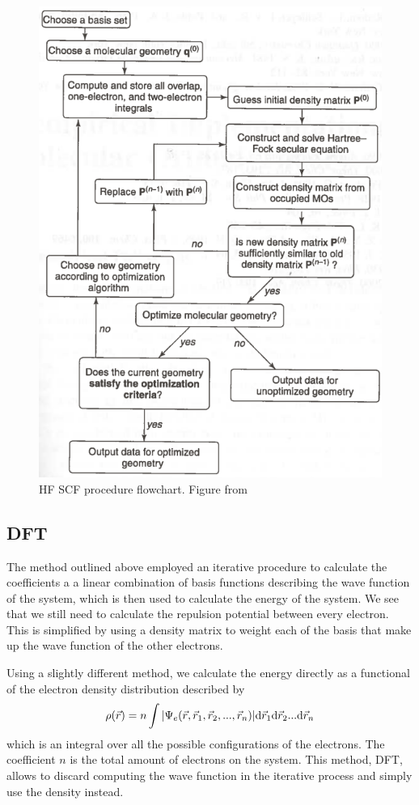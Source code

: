 \documentclass[../master_thesis.tex]{subfiles}
\begin{document}
\begin{figure}[ht]
  \includegraphics[width=\linewidth]{img/SCF.png}
  \caption{HF SCF procedure flowchart. Figure from \cite{Cramer:2004}}
  \label{fig:SCF}
\end{figure}

\subsection{\ac{DFT}}
The method outlined above employed an iterative procedure to calculate the coefficients
a a linear combination of basis functions describing the wave function of the
system, which is then used to calculate the energy of the system. We see that we
still need to calculate the repulsion potential between every electron. This is
simplified by using a density matrix to weight each of the basis that make up the
wave function of the other electrons.

Using a slightly different method, we calculate the energy directly as a functional
of the electron density distribution \cite{Sorland, Cramer:2004} described by
\begin{equation}\label{eq:densityintegral}
  \rho(\vec{r}) = n \int\abs{\Psi_e(\vec{r}, \vec{r}_1, \vec{r}_2,..., \vec{r}_n)} \text{d}\vec{r}_1\text{d}\vec{r}_2...\text{d}\vec{r}_n
\end{equation}
which is an integral over all the possible configurations of the electrons. The
coefficient $n$ is the total amount of electrons on the system. This method,
\ac{DFT}, allows to discard computing the wave function in the iterative process and
simply use the density instead.
\end{document}
